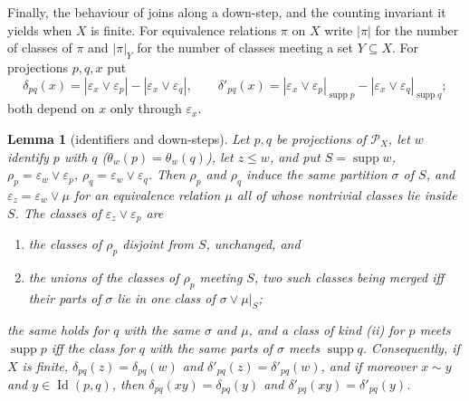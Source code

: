 \documentclass[11pt]{amsart}
\newtheorem{lemma}[theorem]{Lemma}
\theoremstyle{definition}
\renewcommand{\P}{\mathcal{P}}      %
\newcommand{\supp}{\operatorname{supp}}
\newcommand{\Id}{\operatorname{Id}}
\begin{document}
Finally, the behaviour of joins along a down-step, and the counting invariant it yields when $X$ is finite. For equivalence relations $\pi$ on $X$ write $|\pi|$ for the number of classes of $\pi$ and $|\pi|_Y$ for the number of classes meeting a set $Y\subseteq X$. For projections $p,q,x$ put
\[
\delta_{pq}(x)=|\varepsilon_x\vee\varepsilon_p|-|\varepsilon_x\vee\varepsilon_q|,\qquad
\delta'_{pq}(x)=|\varepsilon_x\vee\varepsilon_p|_{\supp p}-|\varepsilon_x\vee\varepsilon_q|_{\supp q};
\]
both depend on $x$ only through $\varepsilon_x$.

\begin{lemma}[identifiers and down-steps]\label{lem:count}
Let $p,q$ be projections of $\P_X$, let $w$ identify $p$ with $q$ ($\theta_w(p)=\theta_w(q)$), let $z\le w$, and put $S=\supp w$, $\rho_p=\varepsilon_w\vee\varepsilon_p$, $\rho_q=\varepsilon_w\vee\varepsilon_q$. Then $\rho_p$ and $\rho_q$ induce the same partition $\sigma$ of $S$, and $\varepsilon_z=\varepsilon_w\vee\mu$ for an equivalence relation $\mu$ all of whose nontrivial classes lie inside $S$. The classes of $\varepsilon_z\vee\varepsilon_p$ are
\begin{enumerate}[label=\textup{(\roman*)},nosep]
\item the classes of $\rho_p$ disjoint from $S$, unchanged, and
\item the unions of the classes of $\rho_p$ meeting $S$, two such classes being merged iff their parts of $\sigma$ lie in one class of $\sigma\vee\mu|_S$;
\end{enumerate}
the same holds for $q$ with the same $\sigma$ and $\mu$, and a class of kind \textup{(ii)} for $p$ meets $\supp p$ iff the class for $q$ with the same parts of $\sigma$ meets $\supp q$. Consequently, if $X$ is finite, $\delta_{pq}(z)=\delta_{pq}(w)$ and $\delta'_{pq}(z)=\delta'_{pq}(w)$, and if moreover $x\sim y$ and $y\in\Id(p,q)$, then $\delta_{pq}(xy)=\delta_{pq}(y)$ and $\delta'_{pq}(xy)=\delta'_{pq}(y)$.
\end{lemma}
\end{document}

